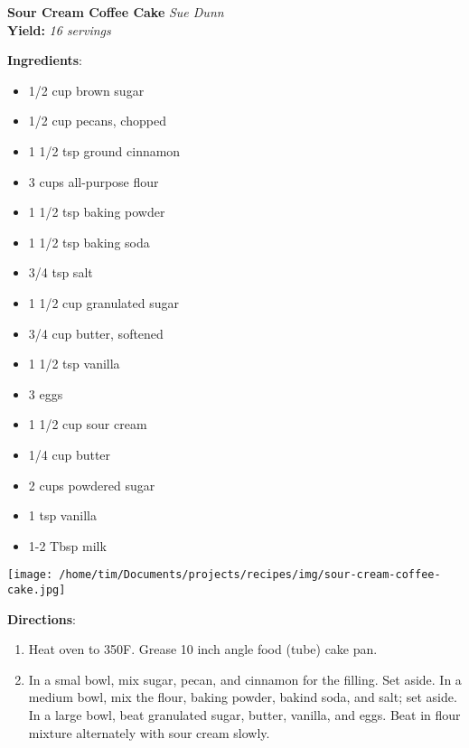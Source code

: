 \documentclass[11pt, twoside, openany]{book}
\begin{document}
\noindent\begin{minipage}[t]{\linewidth}%
{\Large\textbf{Sour Cream Coffee Cake}} \label{sour-cream-coffee-cake}\hfill\textit{Sue Dunn}\\
\textbf{Yield:} \textit{16 servings}\\
\noindent\begin{minipage}[t]{0.78\linewidth}%
\textbf{Ingredients}:\vspace{-3mm}
\begin{multicols}{2}
\begin{itemize}\setlength\itemsep{-1mm}
\item 1/2 cup brown sugar
\item 1/2 cup pecans, chopped
\item 1 1/2 tsp ground cinnamon
\item 3 cups all-purpose flour
\item 1 1/2 tsp baking powder
\item 1 1/2 tsp baking soda
\item 3/4 tsp salt
\item 1 1/2 cup granulated sugar
\item 3/4 cup butter, softened
\item 1 1/2 tsp vanilla
\item 3 eggs
\item 1 1/2 cup sour cream
\item 1/4 cup butter
\item 2 cups powdered sugar
\item 1 tsp vanilla
\item 1-2 Tbsp milk
\end{itemize}
\end{multicols}
\end{minipage}
\noindent\begin{minipage}[t]{0.18\linewidth}
\centering \strut\vspace*{-\baselineskip}\newline
\texttt{[image: /home/tim/Documents/projects/recipes/img/sour-cream-coffee-cake.jpg]}\\
\end{minipage}\vspace{3mm}
\textbf{Directions}:
\vspace{-3mm}\begin{enumerate}\setlength\itemsep{-1mm}
\item Heat oven to 350F. Grease 10 inch angle food (tube) cake pan.
\item In a smal bowl, mix sugar, pecan, and cinnamon for the filling. Set aside. In a medium bowl, mix the flour, baking powder, bakind soda, and salt; set aside. In a large bowl, beat granulated sugar, butter, vanilla, and eggs. Beat in flour mixture alternately with sour cream slowly.

\end{enumerate}
\end{minipage}
\end{document}
